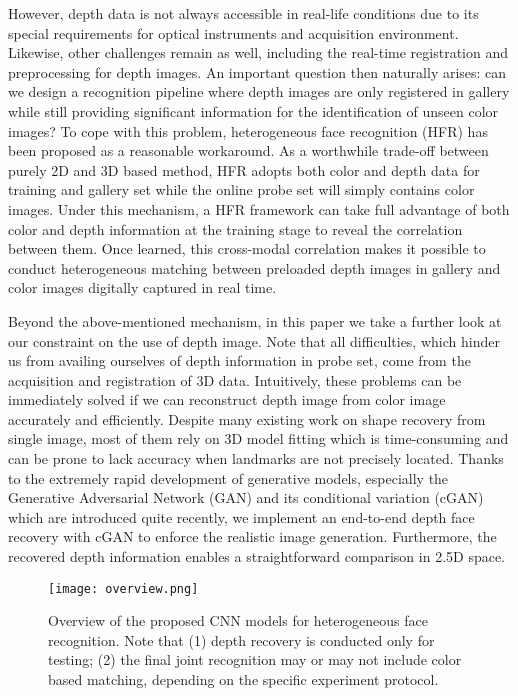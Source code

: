 \documentclass{bmvc2k}
\begin{document}
However, depth data is not always accessible in real-life conditions due to its special requirements for optical instruments and acquisition environment. Likewise, other challenges remain as well, including the real-time registration and preprocessing for depth images. An important question then naturally arises: can we design a recognition pipeline where depth images are only registered in gallery while still providing significant information for the identification of unseen color images? To cope with this problem, heterogeneous face recognition (HFR) \cite{toderici2010bidirectional, zhao2013benchmarking, huang2012oriented} has been proposed as a reasonable workaround. As a worthwhile trade-off between purely 2D and 3D based method, HFR adopts both color and depth data for training and gallery set while the online probe set will simply contains color images. Under this mechanism, a HFR framework can take full advantage of both color and depth information at the training stage to reveal the correlation between them. Once learned, this cross-modal correlation makes it possible to conduct heterogeneous matching between preloaded depth images in gallery and color images digitally captured in real time.

Beyond the above-mentioned mechanism, in this paper we take a further look at our constraint on the use of depth image. Note that all difficulties, which hinder us from availing ourselves of depth information in probe set, come from the acquisition and registration of 3D data. Intuitively, these problems can be immediately solved if we can reconstruct depth image from color image accurately and efficiently. Despite many existing work on shape recovery from single image, most of them rely on 3D model fitting which is time-consuming and can be prone to lack accuracy when landmarks are not precisely located. Thanks to the extremely rapid development of generative models, especially the Generative Adversarial Network (GAN) \cite{goodfellow2014generative} and its conditional variation (cGAN) \cite{mirza2014conditional} which are introduced quite recently, we implement an end-to-end depth face recovery with cGAN to enforce the realistic image generation. Furthermore, the recovered depth information enables a straightforward comparison in 2.5D space. 

\begin{figure}
\texttt{[image: overview.png]}
\caption{Overview of the proposed CNN models for heterogeneous face recognition. Note that (1) depth recovery is conducted only for testing; (2) the final joint recognition may or may not include color based matching, depending on the specific experiment protocol. }
\label{fig:overview}
\end{figure}
\end{document}
